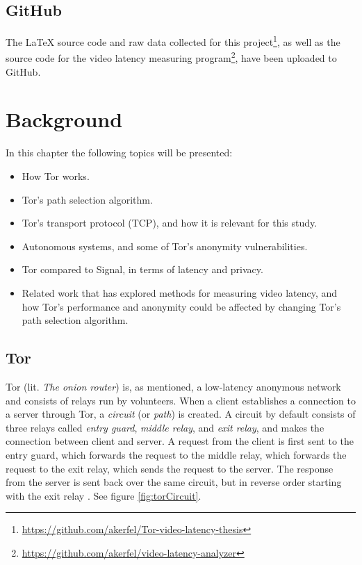 \documentclass{kththesis}
\begin{document}
\section{GitHub}
The LaTeX source code and raw data collected for this project\footnote{\url{https://github.com/akerfel/Tor-video-latency-thesis}}, as well as the source code for the video latency measuring program\footnote{\url{https://github.com/akerfel/video-latency-analyzer}}, have been uploaded to GitHub.

\chapter{Background}
In this chapter the following topics will be presented:

\begin{itemize}
    \item How Tor works.
    \item Tor's path selection algorithm.
    \item Tor's transport protocol (TCP), and how it is relevant for this study.
    \item Autonomous systems, and some of Tor's anonymity vulnerabilities.
    \item Tor compared to Signal, in terms of latency and privacy.
    \item Related work that has explored methods for measuring video latency, and how Tor's performance and anonymity could be affected by changing Tor's path selection algorithm.
\end{itemize}

\section{Tor}
Tor (lit. \emph{The onion router}) is, as mentioned, a low-latency anonymous network and consists of relays run by volunteers. When a client establishes a connection to a server through Tor, a \emph{circuit} (or \emph{path}) is created. A circuit by default consists of three relays called \emph{entry guard}, \emph{middle relay}, and \emph{exit relay}, and makes the connection between client and server. A request from the client is first sent to the entry guard, which forwards the request to the middle relay, which forwards the request to the exit relay, which sends the request to the server. The response from the server is sent back over the same circuit, but in reverse order starting with the exit relay \parencite{UnderstandingTor}. See figure \ref{fig:torCircuit}.
\end{document}
